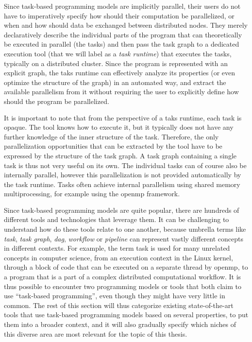 Since task-based programming models are implicitly parallel, their users do not have to
imperatively specify how should their computation be parallelized, or when and how should data be
exchanged between distributed nodes. They merely declaratively describe the individual parts of the
program that can theoretically be executed in parallel (the tasks) and then pass the task graph to
a dedicated execution tool (that we will label as a \emph{task runtime}) that executes the
tasks, typically on a distributed cluster. Since the program is represented with an explicit graph,
the taks runtime can effectively analyze its properties (or even optimize the structure of the
graph) in an automated way, and extract the available parallelism from it without requiring the
user to explicitly define how should the program be parallelized.

It is important to note that from the perspective of a taks runtime, each task is opaque. The tool
knows how to execute it, but it typically does not have any further knowledge of the inner
structure of the task. Therefore, the only parallelization opportunities that can be extracted by
the tool have to be expressed by the structure of the task graph. A task graph containing a single
task is thus not very useful on its own. The individual tasks can of course also be internally
parallel, however this parallelization is not provided automatically by the task runtime. Tasks
often achieve internal parallelism using shared memory multiprocessing, for example using the
\gls{openmp} framework.

Since task-based programming models are quite popular, there are hundreds of different tools and
technologies that leverage them. It can be challenging to understand how do these tools relate to
one another, because umbrella terms like \emph{task}, \emph{task graph},
\emph{\gls{dag}}, \emph{workflow} or \emph{pipeline} can
represent vastly different concepts in different contexts. For example, the term task is used for
many unrelated concepts in computer science, from an execution context in the Linux kernel, through
a block of code that can be executed on a separate thread by \gls{openmp}, to a
program that is a part of a complex distributed computational workflow. It is thus possible to
encounter two programming models or tools that both claim to use ``task-based programming'', even
though they might have very little in common. The rest of this section will thus categorize
existing state-of-the-art tools that use task-based programming models based on several properties,
to put them into a broader context, and it will also gradually specify which niches of this diverse
area are most relevant for the topic of this thesis.


